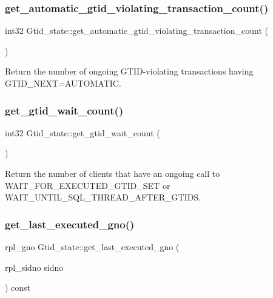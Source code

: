 \subsubsection{\texorpdfstring{get\+\_\+automatic\+\_\+gtid\+\_\+violating\+\_\+transaction\+\_\+count()}{get\_automatic\_gtid\_violating\_transaction\_count()}}
{\footnotesize\ttfamily int32 Gtid\+\_\+state\+::get\+\_\+automatic\+\_\+gtid\+\_\+violating\+\_\+transaction\+\_\+count (\begin{DoxyParamCaption}{ }\end{DoxyParamCaption})\hspace{0.3cm}{\ttfamily [inline]}}

Return the number of ongoing G\+T\+ID-\/violating transactions having G\+T\+I\+D\+\_\+\+N\+E\+XT=A\+U\+T\+O\+M\+A\+T\+IC. \mbox{\label{classGtid__state_a59586299cdb464b0378338eba646fb9c}} 
\subsubsection{\texorpdfstring{get\+\_\+gtid\+\_\+wait\+\_\+count()}{get\_gtid\_wait\_count()}}
{\footnotesize\ttfamily int32 Gtid\+\_\+state\+::get\+\_\+gtid\+\_\+wait\+\_\+count (\begin{DoxyParamCaption}{ }\end{DoxyParamCaption})\hspace{0.3cm}{\ttfamily [inline]}}

Return the number of clients that have an ongoing call to W\+A\+I\+T\+\_\+\+F\+O\+R\+\_\+\+E\+X\+E\+C\+U\+T\+E\+D\+\_\+\+G\+T\+I\+D\+\_\+\+S\+ET or W\+A\+I\+T\+\_\+\+U\+N\+T\+I\+L\+\_\+\+S\+Q\+L\+\_\+\+T\+H\+R\+E\+A\+D\+\_\+\+A\+F\+T\+E\+R\+\_\+\+G\+T\+I\+DS. \mbox{\label{classGtid__state_ad58b3ccada19a67f2b8b5f690d08a309}} 
\subsubsection{\texorpdfstring{get\+\_\+last\+\_\+executed\+\_\+gno()}{get\_last\_executed\_gno()}}
{\footnotesize\ttfamily rpl\+\_\+gno Gtid\+\_\+state\+::get\+\_\+last\+\_\+executed\+\_\+gno (\begin{DoxyParamCaption}\item[{rpl\+\_\+sidno}]{sidno }\end{DoxyParamCaption}) const}

